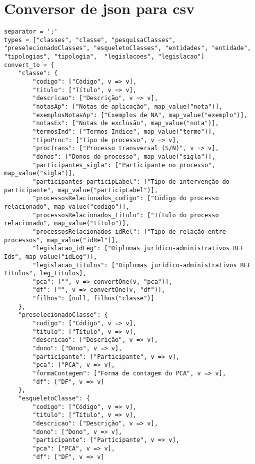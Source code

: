 \section{Conversor de \acrshort{json} para \acrshort{csv}}\label{exem:convCSV}
\begin{lstlisting}[language=pseudocode, caption=Algoritmo de conversão de \acrshort{json} para \acrshort{csv}]
separator = ';'
types = ["classes", "classe", "pesquisaClasses", "preselecionadoClasses", "esqueletoClasses", "entidades", "entidade", "tipologias", "tipologia",  "legislacoes", "legislacao"]
convert_to = {
    "classe": {
        "codigo": ["Código", v => v],
        "titulo": ["Título", v => v],
        "descricao": ["Descrição", v => v],
        "notasAp": ["Notas de aplicação", map_value("nota")],
        "exemplosNotasAp": ["Exemplos de NA", map_value("exemplo")],
        "notasEx": ["Notas de exclusão", map_value("nota")],
        "termosInd": ["Termos Indice", map_value("termo")],
        "tipoProc": ["Tipo de processo", v => v],
        "procTrans": ["Processo transversal (S/N)", v => v],
        "donos": ["Donos do processo", map_value("sigla")],
        "participantes_sigla": ["Participante no processo", map_value("sigla")],
        "participantes_participLabel": ["Tipo de intervenção do participante", map_value("participLabel")],
        "processosRelacionados_codigo": ["Código do processo relacionado", map_value("codigo")],
        "processosRelacionados_titulo": ["Título do processo relacionado", map_value("titulo")],
        "processosRelacionados_idRel": ["Tipo de relação entre processos", map_value("idRel")],
        "legislacao_idLeg": ["Diplomas jurídico-administrativos REF Ids", map_value("idLeg")],
        "legislacao_titulos": ["Diplomas jurídico-administrativos REF Títulos", leg_titulos],
        "pca": ["", v => convertOne(v, "pca")],
        "df": ["", v => convertOne(v, "df")],
        "filhos": [null, filhos("classe")]
    },
    "preselecionadoClasse": {
        "codigo": ["Código", v => v],
        "titulo": ["Título", v => v],
        "descricao": ["Descrição", v => v],
        "dono": ["Dono", v => v],
        "participante": ["Participante", v => v],
        "pca": ["PCA", v => v],
        "formaContagem": ["Forma de contagem do PCA", v => v],
        "df": ["DF", v => v]
    },
    "esqueletoClasse": {
        "codigo": ["Código", v => v],
        "titulo": ["Título", v => v],
        "descricao": ["Descrição", v => v],
        "dono": ["Dono", v => v],
        "participante": ["Participante", v => v],
        "pca": ["PCA", v => v],
        "df": ["DF", v => v]

\end{lstlisting}
